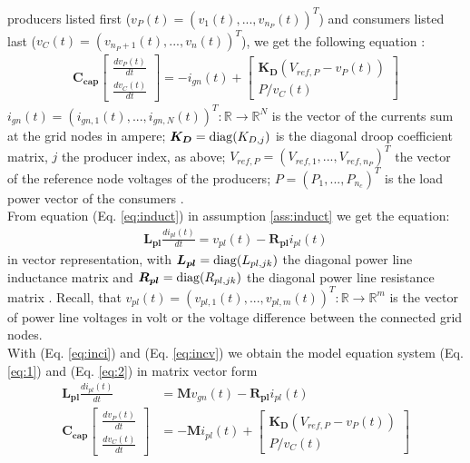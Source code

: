 producers listed first ($v_P(t) = (v_1(t),...,v_{n_P}(t))^T$) and consumers listed last ($v_C(t) = (v_{n_P+1}(t),...,v_n(t))^T$), we get the following equation \cite{lia_stability}:
\begin{align}
    \boldsymbol{C_{cap}}\left[\begin{array}{c} \frac{dv_P(t)}{dt} \\ \frac{dv_C(t)}{dt} \end{array}\right] = -i_{gn}(t) + \left[\begin{array}{c} \boldsymbol{K_{D}}(V_{ref,P} - v_P(t)) \\ P/v_C(t) \end{array}\right]
\end{align}
$i_{gn}(t) = (i_{gn,1}(t),...,i_{gn,N}(t))^T: \mathbb{R} \rightarrow \mathbb{R}^N$ is the vector of the currents sum at the grid nodes in ampere; $\boldsymbol{K_D} = \operatorname{diag}(K_{D,j})$ is the diagonal droop coefficient matrix, $j$ the producer index, as above; $V_{ref,P} = (V_{ref,1},...,V_{ref,n_P})^T$ the vector of the reference node voltages of the producers; $P = (P_1,...,P_{n_c})^T$ is the load power vector of the consumers \cite{lia_stability}. \\From equation (Eq. \ref{eq:induct}) in assumption \ref{ass:induct} we get the equation: 
\begin{align}
    \boldsymbol{L_{pl}} \frac{di_{pl}(t)}{dt} = v_{pl}(t)-\boldsymbol{R_{pl}}i_{pl}(t) 
\end{align} in vector representation, with $\boldsymbol{L_{pl}} = \operatorname{diag}(L_{pl,jk})$ the diagonal power line inductance matrix and $\boldsymbol{R_{pl}} = \operatorname{diag}(R_{pl,jk})$ the diagonal power line resistance matrix \cite{lia_stability}. Recall, that $v_{pl}(t) = (v_{pl,1}(t),...,v_{pl,m}(t))^T: \mathbb{R} \rightarrow \mathbb{R}^m$ is the vector of power line voltages in volt or the voltage difference between the connected grid nodes.
\\With (Eq. \ref{eq:inci}) and (Eq. \ref{eq:incv}) we obtain the model equation system (Eq. \ref{eq:1}) and (Eq. \ref{eq:2}) in matrix vector form \cite{lia_stability}
\begin{align}
    \boldsymbol{L_{pl}} \frac{di_{pl}(t)}{dt} &= \boldsymbol{M}v_{gn}(t)-\boldsymbol{R_{pl}}i_{pl}(t) \label{eq:1} \\
    \boldsymbol{C_{cap}}\left[\begin{array}{c} \frac{dv_P(t)}{dt} \\ \frac{dv_C(t)}{dt} \end{array}\right] &= -\boldsymbol{M}i_{pl}(t) + \left[\begin{array}{c} \boldsymbol{K_{D}}(V_{ref,P} - v_P(t)) \\ P/v_C(t) \end{array}\right] \label{eq:2}
\end{align}
